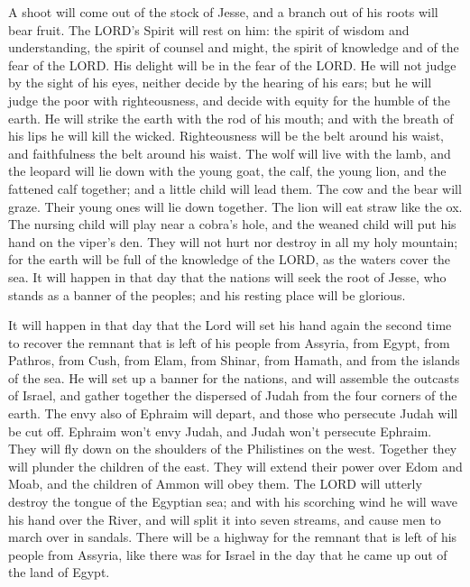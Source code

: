  A shoot will come out of the stock of Jesse, and a branch
out of his roots will bear fruit.  The LORD's Spirit will
rest on him: the spirit of wisdom and understanding, the spirit of
counsel and might, the spirit of knowledge and of the fear of the LORD.
 His delight will be in the fear of the LORD. He will not
judge by the sight of his eyes, neither decide by the hearing of his
ears;  but he will judge the poor with righteousness, and
decide with equity for the humble of the earth. He will strike the earth
with the rod of his mouth; and with the breath of his lips he will kill
the wicked.  Righteousness will be the belt around his
waist, and faithfulness the belt around his waist.  The
wolf will live with the lamb, and the leopard will lie down with the
young goat, the calf, the young lion, and the fattened calf together;
and a little child will lead them.  The cow and the bear
will graze. Their young ones will lie down together. The lion will eat
straw like the ox.  The nursing child will play near a
cobra's hole, and the weaned child will put his hand on the viper's den.
 They will not hurt nor destroy in all my holy mountain;
for the earth will be full of the knowledge of the LORD, as the waters
cover the sea.  It will happen in that day that the
nations will seek the root of Jesse, who stands as a banner of the
peoples; and his resting place will be glorious.

 It will happen in that day that the Lord will set his
hand again the second time to recover the remnant that is left of his
people from Assyria, from Egypt, from Pathros, from Cush, from Elam,
from Shinar, from Hamath, and from the islands of the sea.
 He will set up a banner for the nations, and will
assemble the outcasts of Israel, and gather together the dispersed of
Judah from the four corners of the earth.  The envy also
of Ephraim will depart, and those who persecute Judah will be cut off.
Ephraim won't envy Judah, and Judah won't persecute Ephraim.
 They will fly down on the shoulders of the Philistines
on the west. Together they will plunder the children of the east. They
will extend their power over Edom and Moab, and the children of Ammon
will obey them.  The LORD will utterly destroy the tongue
of the Egyptian sea; and with his scorching wind he will wave his hand
over the River, and will split it into seven streams, and cause men to
march over in sandals.  There will be a highway for the
remnant that is left of his people from Assyria, like there was for
Israel in the day that he came up out of the land of Egypt.

